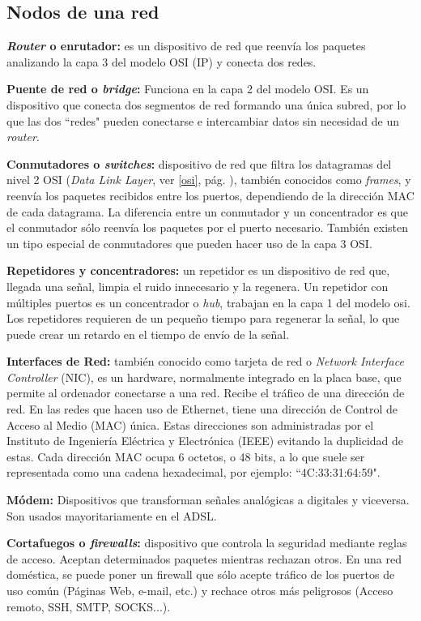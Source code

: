 \documentclass[a4paper, 11pt]{report} %
\begin{document}
\subsection{Nodos de una red}
\begin{description}
\item \textbf{\textit{Router} o enrutador:} es un dispositivo de red que reenvía los paquetes analizando la capa 3 del modelo OSI (IP) y conecta dos redes.
\item \textbf{Puente de red o \textit{bridge}:} Funciona en la capa 2 del modelo OSI. Es un dispositivo que conecta dos segmentos de red formando una única subred, por lo que las dos ``redes" pueden conectarse e intercambiar datos sin necesidad de un \textit{router}.
\item \textbf{Conmutadores o \textit{switches}:} dispositivo de red que filtra los datagramas del nivel 2 OSI (\textit{Data Link Layer}, ver \ref{osi}, pág. \pageref{osi}), también conocidos como \textit{frames}, y reenvía los paquetes recibidos entre los puertos, dependiendo de la dirección MAC de cada datagrama. La diferencia entre un conmutador y un concentrador es que el conmutador sólo reenvía los paquetes por el puerto necesario. También existen un tipo especial de conmutadores que pueden hacer uso de la capa 3 OSI.
\item \textbf{Repetidores y concentradores:} un repetidor es un dispositivo de red que, llegada una señal, limpia el ruido innecesario y la regenera. Un repetidor con múltiples puertos es un concentrador o \textit{hub}, trabajan en la capa 1 del modelo \acrshort{osi}. Los repetidores requieren de un pequeño tiempo para regenerar la señal, lo que puede crear un retardo en el tiempo de envío de la señal.

\newpage
\item \textbf{Interfaces de Red:} también conocido como tarjeta de red o \textit{Network Interface Controller} (NIC), es un \gls{hardware}, normalmente integrado en la placa base, que permite al ordenador conectarse a una red. Recibe el tráfico de una dirección de red. En las redes que hacen uso de Ethernet, tiene una dirección de Control de Acceso al Medio (\acrshort{MAC}) única. Estas direcciones son administradas por el Instituto de Ingeniería Eléctrica y Electrónica (\acrshort{IEEE}) evitando la duplicidad de estas. Cada dirección MAC ocupa 6 octetos, o 48 bits, a lo que suele ser representada como una cadena hexadecimal, por ejemplo: ``4C:33:31:64:59".
\item \textbf{Módem:} Dispositivos que transforman señales analógicas a digitales y viceversa. Son usados mayoritariamente en el \acrshort{ADSL}.
\item \textbf{Cortafuegos o \textit{firewalls}:} dispositivo que controla la seguridad mediante reglas de acceso. Aceptan determinados paquetes mientras rechazan otros. En una red doméstica, se puede poner un firewall que sólo acepte tráfico de los puertos de uso común (Páginas Web, e-mail, etc.) y rechace otros más peligrosos (Acceso remoto, SSH, SMTP, SOCKS...).
\end{description}
\end{document}
